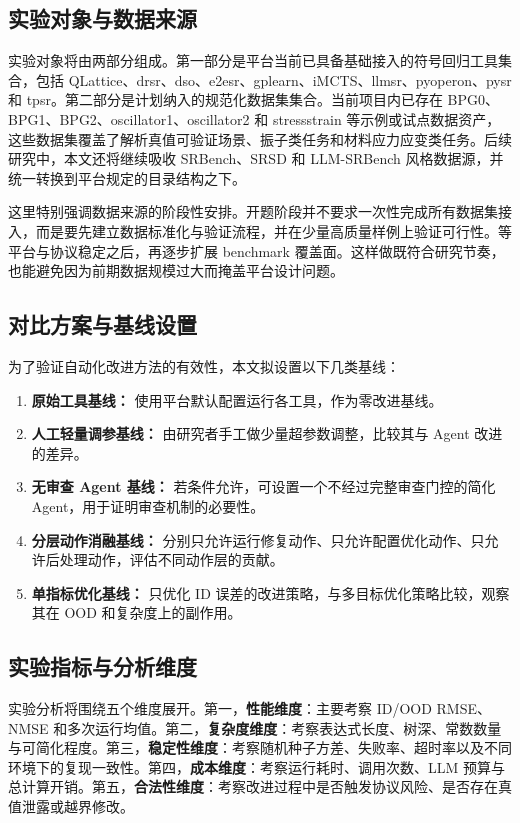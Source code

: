 \documentclass[UTF8,12pt]{ctexart}
\begin{document}
\subsection{实验对象与数据来源}

实验对象将由两部分组成。第一部分是平台当前已具备基础接入的符号回归工具集合，包括 QLattice、drsr、dso、e2esr、gplearn、iMCTS、llmsr、pyoperon、pysr 和 tpsr。第二部分是计划纳入的规范化数据集集合。当前项目内已存在 BPG0、BPG1、BPG2、oscillator1、oscillator2 和 stressstrain 等示例或试点数据资产，这些数据集覆盖了解析真值可验证场景、振子类任务和材料应力应变类任务。后续研究中，本文还将继续吸收 SRBench、SRSD 和 LLM-SRBench 风格数据源，并统一转换到平台规定的目录结构之下。

这里特别强调数据来源的阶段性安排。开题阶段并不要求一次性完成所有数据集接入，而是要先建立数据标准化与验证流程，并在少量高质量样例上验证可行性。等平台与协议稳定之后，再逐步扩展 benchmark 覆盖面。这样做既符合研究节奏，也能避免因为前期数据规模过大而掩盖平台设计问题。

\subsection{对比方案与基线设置}

为了验证自动化改进方法的有效性，本文拟设置以下几类基线：
\begin{enumerate}
    \item \textbf{原始工具基线：} 使用平台默认配置运行各工具，作为零改进基线。
    \item \textbf{人工轻量调参基线：} 由研究者手工做少量超参数调整，比较其与 Agent 改进的差异。
    \item \textbf{无审查 Agent 基线：} 若条件允许，可设置一个不经过完整审查门控的简化 Agent，用于证明审查机制的必要性。
    \item \textbf{分层动作消融基线：} 分别只允许运行修复动作、只允许配置优化动作、只允许后处理动作，评估不同动作层的贡献。
    \item \textbf{单指标优化基线：} 只优化 ID 误差的改进策略，与多目标优化策略比较，观察其在 OOD 和复杂度上的副作用。
\end{enumerate}

\subsection{实验指标与分析维度}

实验分析将围绕五个维度展开。第一，\textbf{性能维度}：主要考察 ID/OOD RMSE、NMSE 和多次运行均值。第二，\textbf{复杂度维度}：考察表达式长度、树深、常数数量与可简化程度。第三，\textbf{稳定性维度}：考察随机种子方差、失败率、超时率以及不同环境下的复现一致性。第四，\textbf{成本维度}：考察运行耗时、调用次数、LLM 预算与总计算开销。第五，\textbf{合法性维度}：考察改进过程中是否触发协议风险、是否存在真值泄露或越界修改。
\end{document}
